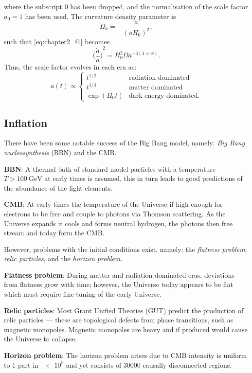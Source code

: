 %
where the subscript \(0\) has been dropped, and the normalisation of the scale factor \(a_{0}=1\) has been used.
The curvature density parameter is
%
\begin{equation}
	\Omega_{k}
	= -\frac{a}{{(aH_{0})}^{2}},
\end{equation}
%
such that \cref{eq:chapter2_f1} becomes
%
\begin{equation}
	{\bigg(\frac{\dot{a}}{a}\bigg)}^{2}
	= H_{0}^{2} \Omega a^{-3(1+w)}.
\end{equation}
%
Thus, the scale factor evolves in each era as:
%
\begin{equation}
	a(t) \propto
	\begin{cases}
		t^{1/2}      & \text{radiation dominated}    \\
		t^{1/3}      & \text{matter dominated}       \\
		\exp(H_{0}t) & \text{dark energy dominated}.
	\end{cases}
\end{equation}

\subsection{Inflation}\label{sec:chapter2_inflation}

There have been some notable success of the Big Bang model, namely: \emph{Big Bang nucleosynthesis} (BBN) and the CMB\@.

\begin{hangparas}{24pt}{1}
	\textbf{BBN}:
	A thermal bath of standard model particles with a temperature \(T > \SI{100}{\giga\eV}\) at early times is assumed, this in turn leads to good predictions of the abundance of the light elements.

	\textbf{CMB}:
	At early times the temperature of the Universe if high enough for electrons to be free and couple to photons via Thomson scattering.
	As the Universe expands it cools and forms neutral hydrogen, the photons then free stream and today form the CMB\@.
\end{hangparas}

\noindent
However, problems with the initial conditions exist, namely: the \emph{flatness problem}, \emph{relic particles}, and the \emph{horizon problem}.

\begin{hangparas}{24pt}{1}
	\textbf{Flatness problem}:
	During matter and radiation dominated eras, deviations from flatness grow with time; however, the Universe today appears to be flat which must require fine-tuning of the early Universe.

	\textbf{Relic particles}:
	Most Grant Unified Theories (GUT) predict the production of relic particles --- these are topological defects from phase transitions, such as magnetic monopoles.
	Magnetic monopoles are heavy and if produced would cause the Universe to collapse.

	\textbf{Horizon problem}:
	The horizon problem arises due to CMB intensity is uniform to 1 part in \(\num{e5}\) and yet consists of \(\num{30000}\) causally disconnected regions.
\end{hangparas}

